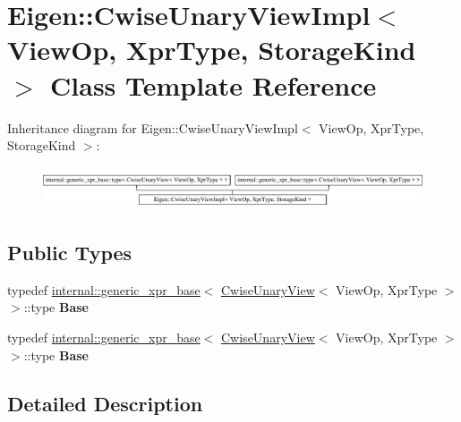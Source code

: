 \hypertarget{class_eigen_1_1_cwise_unary_view_impl}{}\section{Eigen\+:\+:Cwise\+Unary\+View\+Impl$<$ View\+Op, Xpr\+Type, Storage\+Kind $>$ Class Template Reference}
\label{class_eigen_1_1_cwise_unary_view_impl}
Inheritance diagram for Eigen\+:\+:Cwise\+Unary\+View\+Impl$<$ View\+Op, Xpr\+Type, Storage\+Kind $>$\+:\begin{figure}[H]
\begin{center}
\leavevmode
\includegraphics[height=1.252796cm]{class_eigen_1_1_cwise_unary_view_impl}
\end{center}
\end{figure}
\subsection*{Public Types}
\begin{DoxyCompactItemize}
\item 
\mbox{\label{class_eigen_1_1_cwise_unary_view_impl_ad6b354855853520e99dd02f2f69d2bf6}} 
typedef \hyperlink{struct_eigen_1_1internal_1_1generic__xpr__base}{internal\+::generic\+\_\+xpr\+\_\+base}$<$ \hyperlink{group___core___module_class_eigen_1_1_cwise_unary_view}{Cwise\+Unary\+View}$<$ View\+Op, Xpr\+Type $>$ $>$\+::type {\bfseries Base}
\item 
\mbox{\label{class_eigen_1_1_cwise_unary_view_impl_ad6b354855853520e99dd02f2f69d2bf6}} 
typedef \hyperlink{struct_eigen_1_1internal_1_1generic__xpr__base}{internal\+::generic\+\_\+xpr\+\_\+base}$<$ \hyperlink{group___core___module_class_eigen_1_1_cwise_unary_view}{Cwise\+Unary\+View}$<$ View\+Op, Xpr\+Type $>$ $>$\+::type {\bfseries Base}
\end{DoxyCompactItemize}


\subsection{Detailed Description}
